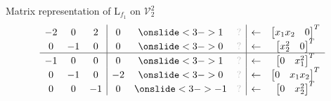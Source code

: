 \documentclass[10pt,T]{beamer}
\newcommand{\transparent}[1]{\textcolor{lightgray}{#1}}
\begin{document}
\begin{frame}[b]{Matrix representation of L$_{f_1}$ on $\mathcal{V}_2^2$}
\begin{equation*}
\begin{array}{ccc|ccc|cc}
    -2&0&2&0&\onslide<3->{1}&\transparent{?}&\leftarrow&\begin{bmatrix}x_1x_2&0\end{bmatrix}^T\\
    0&-1&0&0&\onslide<3->{0}&\transparent{?}&\leftarrow&\begin{bmatrix}x_2^2&0\end{bmatrix}^T\\\hline
    -1&0&0&0&\onslide<3->{1}&\transparent{?}&\leftarrow&\begin{bmatrix}0&x_1^2\end{bmatrix}^T\\
    0&-1&0&-2&\onslide<3->{0}&\transparent{?}&\leftarrow&\begin{bmatrix}0&x_1x_2\end{bmatrix}^T\\
    0&0&-1&0&\onslide<3->{-1}&\transparent{?}&\leftarrow&\begin{bmatrix}0&x_2^2\end{bmatrix}^T
    \end{array}
\end{equation*}
\end{frame}
\end{document}
